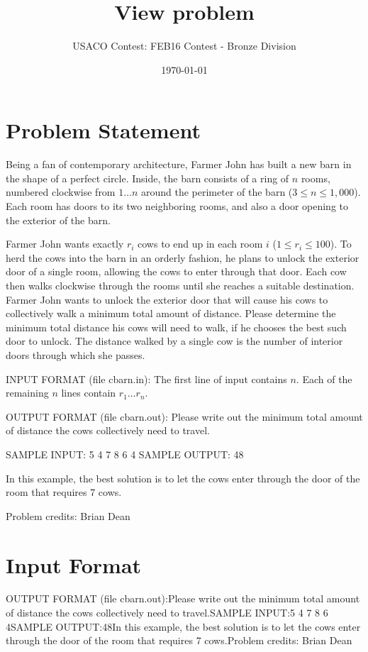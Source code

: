 \documentclass[12pt]{article}
\title{View problem}
\author{USACO Contest: FEB16 Contest - Bronze Division}
\date{\today}
\begin{document}
\maketitle

\section*{Problem Statement}

Being a fan of contemporary architecture, Farmer John has built a new barn in
the shape of a perfect circle.  Inside, the barn consists of a ring of $n$
rooms,  numbered clockwise from $1 \ldots n$ around the perimeter of the barn
($3 \leq n \leq 1,000$).  Each room  has doors to its two neighboring rooms, and
also a door opening to the exterior of the barn.

Farmer John wants exactly $r_i$ cows to end up in each room $i$
($1 \leq r_i \leq 100$). To herd the cows into the barn in an orderly fashion,
he plans to unlock the exterior door of a single room, allowing the cows to
enter through that door. Each cow then walks clockwise through the rooms until
she reaches a suitable destination.  Farmer John wants to unlock the exterior
door that will cause his cows to collectively walk a minimum total amount of
distance.  Please determine the minimum total distance his cows will need to
walk, if he chooses the best such door to unlock.  The distance walked by a
single cow is the number of interior doors through which she passes.

INPUT FORMAT (file cbarn.in):
The first line of input contains $n$.  Each of the remaining $n$ lines contain
$r_1 \ldots r_n$.

OUTPUT FORMAT (file cbarn.out):
Please write out the minimum total amount of distance the cows collectively need
to travel.

SAMPLE INPUT:
5
4
7
8
6
4
SAMPLE OUTPUT: 
48

In this example, the best solution is to let the cows enter through the
door of the room that requires 7 cows.

Problem credits: Brian Dean



\section*{Input Format}
OUTPUT FORMAT (file cbarn.out):Please write out the minimum total amount of distance the cows collectively need
to travel.SAMPLE INPUT:5
4
7
8
6
4SAMPLE OUTPUT:48In this example, the best solution is to let the cows enter through the
door of the room that requires 7 cows.Problem credits: Brian Dean
\end{document}
